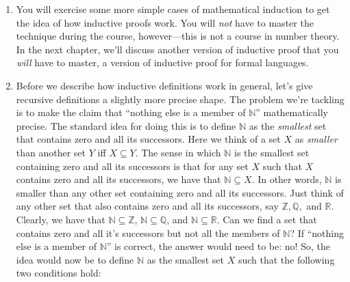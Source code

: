 \begin{enumerate}[{\thesection}.1]
\begin{proof}
\begin{enumerate}[(i)]
	\end{enumerate}
	We prove these in turn.
	
	For the base case, (i), note that by (i) of 3.7.3, $f(n,0)=0$ for every $n\in\mathbb{N}$. Since $n\cdot 0=0$ for all $n\in\mathbb{N}$, the claim holds.
	
	For the induction step, (ii), let $n,m\in\mathbb{N}$ be arbitrary numbers and assume that $f(n,m)=n\cdot m$ as the induction hypothesis. Consider $f(n,m+1)$. By clause (ii) of 3.7.3, we know that $f(n,m+1)=f(n,m)+n$. But by the induction hypothesis, we know that $f(n,m)=n\cdot m$, so we get $f(n,m+1)=f(n,m)+n=(n\cdot m)+n=n\cdot (m+1)$, which is what we needed to show.
	
	Hence, by mathematical induction, we conclude that for all $n,m\in\mathbb{N}$, we have that $f(n,m)=n\cdot m$.
	\end{proof}

Proof  by induction over the natural numbers is also called \emph{mathematical induction}. Essentially, each inductively defined set has its own principle for proof by induction. In the following chapter, we will discuss how to prove things about all formulas of a formal language using proof by induction.

	\item You will exercise some more simple cases of mathematical induction to get the idea of how inductive proofs work. You will \emph{not} have to master the technique during the course, however---this is not a course in number theory. In the next chapter, we'll discuss another version of inductive proof that you \emph{will} have to master, a version of inductive proof for formal languages.
	
	\item Before we describe how inductive definitions work in general, let's give recursive definitions a slightly more precise shape. The problem we're tackling is to make the claim that ``nothing else is a member of $\mathbb{N}$'' mathematically precise. The standard idea for doing this is to define $\mathbb{N}$ as the \emph{smallest} set that contains zero and all its successors.  Here we think of a set $X$ as \emph{smaller} than another set $Y$ iff $X\subseteq Y$. The sense in which $\mathbb{N}$ is the smallest set containing zero and all its successors is that for any set $X$ such that $X$ contains zero and all its successors, we have that $\mathbb{N}\subseteq X$. In other words, $\mathbb{N}$ is smaller than any other set containing zero and all its successors.  Just think of any other set that also contains zero and all its successors, say $\mathbb{Z}, \mathbb{Q},$ and $\mathbb{R}$. Clearly, we have that $\mathbb{N}\subseteq \mathbb{Z}$, $\mathbb{N}\subseteq \mathbb{Q}$, and $\mathbb{N}\subseteq \mathbb{R}$. Can we find a set that contains zero and all it's successors but not all the members of $\mathbb{N}$? If ``nothing else is a member of $\mathbb{N}$'' is correct, the answer would need to be: no! So, the idea would now be to define $\mathbb{N}$ as the smallest set $X$ such that the following two conditions hold: 
	\begin{enumerate}[(i)]
	

\end{enumerate}
\end{enumerate}
